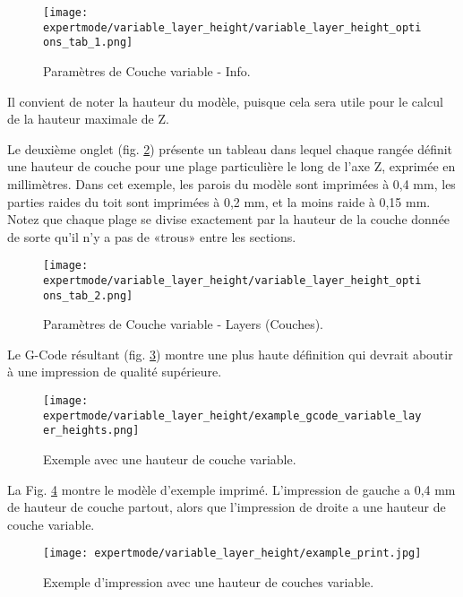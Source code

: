 \begin{figure}[H]
\centering
\texttt{[image: expertmode/variable\_layer\_height/variable\_layer\_height\_options\_tab\_1.png]}
\caption{Param\`etres de Couche variable - Info.}
\label{fig:variable_layer_height_options_tab_1}
\end{figure}

Il convient de noter la hauteur du mod\`ele, puisque cela sera utile pour le calcul de la hauteur maximale de Z.

Le deuxi\`eme onglet (fig. \ref{fig:variable_layer_height_options_tab_2}) pr\'esente un tableau dans lequel chaque rang\'ee d\'efinit une hauteur de couche pour une plage particuli\`ere le long de l'axe Z, exprim\'ee en millim\`etres. Dans cet exemple, les parois du mod\`ele sont imprim\'ees \`a 0,4 mm, les parties raides du toit sont imprim\'ees \`a 0,2 mm, et la moins raide \`a 0,15 mm. Notez que chaque plage se divise exactement par la hauteur de la couche donn\'ee de sorte qu'il n'y a pas de «trous» entre les sections.

\begin{figure}[H]
\centering
\texttt{[image: expertmode/variable\_layer\_height/variable\_layer\_height\_options\_tab\_2.png]}
\caption{Param\`etres de Couche variable - Layers (Couches).}
\label{fig:variable_layer_height_options_tab_2}
\end{figure}

Le G-Code r\'esultant (fig. \ref{fig:example_gcode_variable_layer_heights}) montre une plus haute d\'efinition qui devrait aboutir \`a une impression de qualit\'e sup\'erieure.

\begin{figure}[H]
\centering
\texttt{[image: expertmode/variable\_layer\_height/example\_gcode\_variable\_layer\_heights.png]}
\caption{Exemple avec une hauteur de couche variable.}
\label{fig:example_gcode_variable_layer_heights}
\end{figure}

La Fig. \ref{fig:example_print} montre le mod\`ele d'exemple imprim\'e.  L'impression de gauche a 0,4 mm  de hauteur de couche partout, alors que l'impression de droite a une hauteur de couche variable.

\begin{figure}[H]
\centering
\texttt{[image: expertmode/variable\_layer\_height/example\_print.jpg]}
\caption{Exemple d'impression avec une hauteur de couches variable.}
\label{fig:example_print}
\end{figure}

